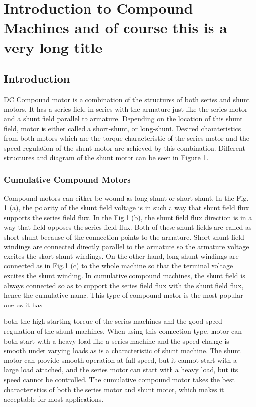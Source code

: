 

\chapter{Introduction to Compound Machines and of course this is a very long title}

\section{Introduction} %

DC Compound motor is a combination of the structures of both series and shunt motors. It has a
series field in series with the armature just like the series motor and a shunt field parallel
to armature. Depending on the location of this shunt field, motor is either called a
short-shunt, or long-shunt. Desired charateristics from both motors which are the torque
characteristic of the series motor and the speed regulation of the shunt motor are achieved by
this combination. Different structures and diagram of the shunt motor can be seen in Figure 1.
 
\subsection{Cumulative Compound Motors} %

Compound motors can either be wound as long-shunt or short-shunt. In the Fig. 1 (a), the polarity of the shunt field voltage is in such a way that shunt field flux supports the series field flux. In the Fig.1 (b), the shunt field flux direction is in a way that field opposes the series field flux. Both of these shunt fields are called as short-shunt because of the connection points to the armature. Short shunt field windings are connected directly parallel to the armature so the armature voltage excites the short shunt windings. On the other hand, long shunt windings are connected as in Fig.1 (c) to the whole machine so that the terminal voltage excites the shunt winding.
In cumulative compound machines, the shunt field is always connected so as to support the series field flux with the shunt field flux, hence the cumulative name. This type of compound motor is the most popular one as it has

both the high starting torque of the series machines and the good speed regulation of the shunt machines. When using this connection type, motor can both start with a heavy load like a series machine and the speed change is smooth under varying loads as is a characteristic of shunt machine. The shunt motor can provide smooth operation at full speed, but it cannot start with a large load attached, and the series motor can start with a heavy load, but its speed cannot be controlled. The cumulative compound motor takes the best characteristics of both the series motor and shunt motor, which makes it acceptable for most applications.

